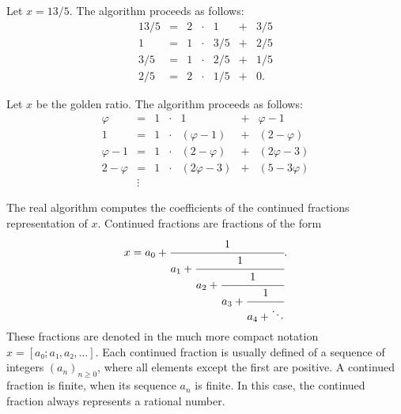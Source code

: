 \begin{example}
  Let $x = 13/5$.
  The algorithm proceeds as follows:
  \[
    \begin{array}{rclcrcl}
      13/5 & = & 2 & · & 1   & + & 3/5 \\
         1 & = & 1 & · & 3/5 & + & 2/5 \\
       3/5 & = & 1 & · & 2/5 & + & 1/5 \\
       2/5 & = & 2 & · & 1/5 & + & 0.
    \end{array}
  \]
\end{example}

\begin{example}
  Let $x$ be the golden ratio.
  The algorithm proceeds as follows:
  \[
    \begin{array}{rclcrcl}
      φ & = & 1 & · & 1   & + & φ - 1 \\
         1 & = & 1 & · & (φ - 1) & + & (2 - φ) \\
       φ - 1 & = & 1 & · & (2 - φ) & + & (2φ - 3) \\
       2 - φ & = & 1 & · & (2φ - 3) & + & (5 - 3φ) \\
       & \vdots &
    \end{array}
  \]
\end{example}


The real algorithm computes the coefficients of the continued fractions representation of $x$.
Continued fractions are fractions of the form
\[
  x = a_0 + \cfrac{1}{a_1 + \cfrac{1}{a_2 + \cfrac{1}{a_3 + \cfrac{1}{a_4 + \ddots}}}}.
\]
These fractions are denoted in the much more compact notation $x = [a₀; a₁, a₂, …]$.
Each continued fraction is usually defined of a sequence of integers $(a_n)_{n ≥ 0}$,
where all elements except the first are positive.
A continued fraction is finite, when its sequence $a_n$ is finite.
In this case, the continued fraction always represents a rational number.
